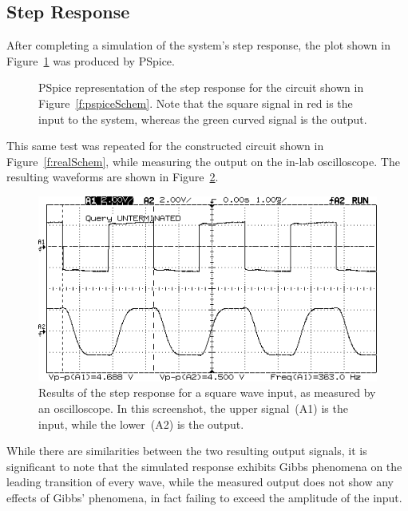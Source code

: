 \subsection{Step Response}
After completing a simulation of the system's step response, the plot shown
in Figure~\ref{f:stepSim} was produced by PSpice.
%
\begin{figure}[H]
	\centering
	
	\parbox{.6\textwidth}{
	\caption[Simulated Step Response]{PSpice representation of the step
	response for the circuit shown in Figure~\ref{f:pspiceSchem}.  Note that
	the square signal in red is the input to the system, whereas the green
	curved signal is the output.}
	\label{f:stepSim}}
\end{figure}
%
This same test was repeated for the constructed circuit shown in
Figure~\ref{f:realSchem}, while measuring the output on the in-lab
oscilloscope.  The resulting waveforms are shown in Figure~\ref{f:stepReal}.
%
\begin{figure}[H]
	\centering
	\includegraphics[width=.8\textwidth]{img/shot/squareWaveShot.png}
	\parbox{.6\textwidth}{
	\caption[Measured Step Response]{Results of the step response for a
	square wave input, as measured by an oscilloscope.  In this screenshot, the
	upper signal~(A1) is the input, while the lower~(A2) is the output.}
	\label{f:stepReal}}
\end{figure}
%
While there are similarities between the two resulting output signals, it is
significant to note that the simulated response exhibits Gibbs phenomena on the
leading transition of every wave, while the measured output does not show any
effects of Gibbs' phenomena, in fact failing to exceed the amplitude of the
input.

